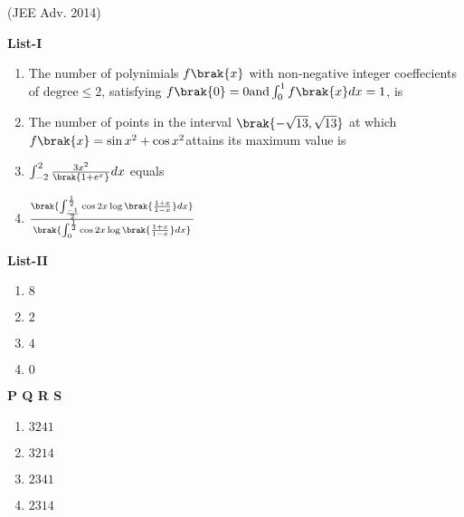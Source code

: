 		\item 
			\hfill{(JEE Adv. 2014)}
			\begin{multicols}{2}
				\textbf{List-I} 
				\begin{enumerate}
					\item The number of polynimials $f\brak{x}$ with non-negative integer coeffecients of $\text{degree} \leq 2$, satisfying $f\brak{0}=0 \text{and} \int_{0}^{1}f\brak{x}dx=1$, is
					\item The number of points in the interval $\brak{-\sqrt{13},\sqrt{13}}$ at which $f\brak{x}= \sin x^{2}+\cos x^{2}$attains its maximum value is
					\item $\int_{-2}^{2}\frac{3x^{2}}{\brak{1+e^{x}}}dx$ equals
					\item $\frac{\brak{\int_{\frac{-1}{2}}^{\frac{1}{2}}\cos 2x\log\brak{\frac{1+x}{1-x}}dx}}{\brak{\int_{0}^{\frac{1}{2}}\cos 2x\log\brak{\frac{1+x}{1-x}}dx}}$
				\end{enumerate}
				\columnbreak
				\textbf{List-II}
				\begin{enumerate}
					\item $8$

					\item $2$

					\item $4$

					\item $0$
				\end{enumerate}
		\end{multicols}
			\textbf{   P Q R S}
			\begin{enumerate}
		
				\item $3 2 4 1$
				\item $3 2 1 4$
				\item $2 3 4 1$
				\item $2 3 1 4$
			\end{enumerate}
